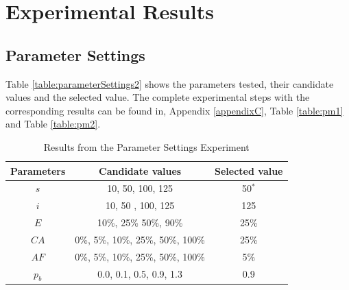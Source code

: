 \section{Experimental Results}
\label{sec:expResults}

\subsection{Parameter Settings}
\label{subsec:parameterSettings_results}

Table \vref{table:parameterSettings2} shows the parameters tested, their candidate values and the selected value. The complete experimental steps with the corresponding results can be found in, Appendix \ref{appendixC}, Table \vref{table:pm1} and Table \vref{table:pm2}. 

    \begin{table}[H]
    \centering
    \begin{tabular}{|c|c||c|}
    \hline
    Parameters & Candidate values & Selected value\\
    \hline
    $s$ & 10, 50, 100, 125 & 50$^*$ \\
    $i$ & 10, 50 , 100, 125 & 125\\
    $E$ & 10\%, 25\% 50\%, 90\% & 25\% \\
    $CA$ & 0\%, 5\%, 10\%, 25\%, 50\%, 100\% & 25\% \\
    $AF$ & 0\%, 5\%, 10\%, 25\%, 50\%, 100\% & 5\% \\
    $p_{b}$ & 0.0, 0.1, 0.5, 0.9, 1.3 & 0.9 \\
    \hline
    \end{tabular}
    \caption {Results from the Parameter Settings Experiment}
    \begin{itemize}[noitemsep]
    \end{itemize}
    \label{table:parameterSettings2}
    \end{table}
    
